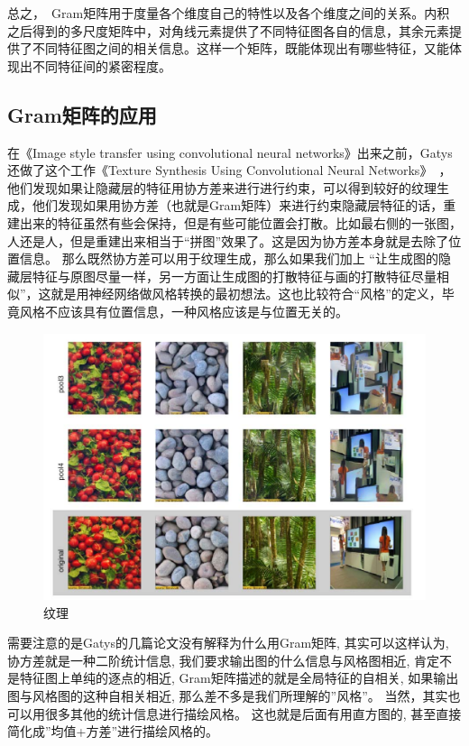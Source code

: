 总之， Gram矩阵用于度量各个维度自己的特性以及各个维度之间的关系。内积之后得到的多尺度矩阵中，对角线元素提供了不同特征图各自的信息，其余元素提供了不同特征图之间的相关信息。这样一个矩阵，既能体现出有哪些特征，又能体现出不同特征间的紧密程度。

\subsection{Gram矩阵的应用}

在《Image style transfer using convolutional neural networks》\cite{gatys2016image}出来之前，Gatys还做了这个工作《Texture Synthesis Using Convolutional Neural Networks》~\cite{gatys2015texture}，他们发现如果让隐藏层的特征用协方差来进行进行约束，可以得到较好的纹理生成，他们发现如果用协方差（也就是Gram矩阵）来进行约束隐藏层特征的话，重建出来的特征虽然有些会保持，但是有些可能位置会打散。比如最右侧的一张图，人还是人，但是重建出来相当于“拼图”效果了。这是因为协方差本身就是去除了位置信息。 那么既然协方差可以用于纹理生成，那么如果我们加上 “让生成图的隐藏层特征与原图尽量一样，另一方面让生成图的打散特征与画的打散特征尽量相似”，这就是用神经网络做风格转换的最初想法。这也比较符合“风格”的定义，毕竟风格不应该具有位置信息，一种风格应该是与位置无关的。

\begin{figure}[hbtp]
  \centering
  \includegraphics[width=0.8 \linewidth]{image/style_transfer/texture.pdf}
  \caption{纹理}
  \label{fig:texture}
\end{figure}

需要注意的是Gatys的几篇论文没有解释为什么用Gram矩阵, 其实可以这样认为, 协方差就是一种二阶统计信息, 我们要求输出图的什么信息与风格图相近, 肯定不是特征图上单纯的逐点的相近, Gram矩阵描述的就是全局特征的自相关, 如果输出图与风格图的这种自相关相近, 那么差不多是我们所理解的”风格”。 当然，其实也可以用很多其他的统计信息进行描绘风格。 这也就是后面有用直方图的, 甚至直接简化成”均值+方差”进行描绘风格的。

